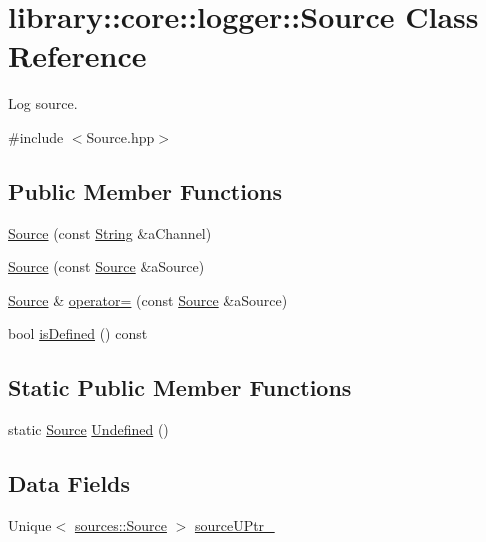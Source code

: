 \hypertarget{classlibrary_1_1core_1_1logger_1_1Source}{}\section{library\+:\+:core\+:\+:logger\+:\+:Source Class Reference}
\label{classlibrary_1_1core_1_1logger_1_1Source}


Log source.  




{\ttfamily \#include $<$Source.\+hpp$>$}

\subsection*{Public Member Functions}
\begin{DoxyCompactItemize}
\item 
\hyperlink{classlibrary_1_1core_1_1logger_1_1Source_a2e40fbdae5f8f4dd6a075992f11a939f}{Source} (const \hyperlink{classlibrary_1_1core_1_1types_1_1String}{String} \&a\+Channel)
\item 
\hyperlink{classlibrary_1_1core_1_1logger_1_1Source_ae9d7e82827aa19efdd1c25d91911a9a6}{Source} (const \hyperlink{classlibrary_1_1core_1_1logger_1_1Source}{Source} \&a\+Source)
\item 
\hyperlink{classlibrary_1_1core_1_1logger_1_1Source}{Source} \& \hyperlink{classlibrary_1_1core_1_1logger_1_1Source_a844032b697c7727ea4e5519fb64fc955}{operator=} (const \hyperlink{classlibrary_1_1core_1_1logger_1_1Source}{Source} \&a\+Source)
\item 
bool \hyperlink{classlibrary_1_1core_1_1logger_1_1Source_ae6316fb0d4e45ea172bdb7004777e9b4}{is\+Defined} () const
\end{DoxyCompactItemize}
\subsection*{Static Public Member Functions}
\begin{DoxyCompactItemize}
\item 
static \hyperlink{classlibrary_1_1core_1_1logger_1_1Source}{Source} \hyperlink{classlibrary_1_1core_1_1logger_1_1Source_a098cba108fe47612f9ddbfb228a5ef8f}{Undefined} ()
\end{DoxyCompactItemize}
\subsection*{Data Fields}
\begin{DoxyCompactItemize}
\item 
Unique$<$ \hyperlink{classlibrary_1_1core_1_1logger_1_1sources_1_1Source}{sources\+::\+Source} $>$ \hyperlink{classlibrary_1_1core_1_1logger_1_1Source_a9461165d5d581171a044200b58007a3a}{source\+U\+Ptr\+\_\+}
\end{DoxyCompactItemize}


